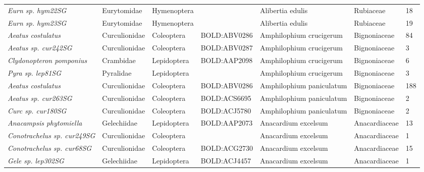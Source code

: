 \documentclass[11pt]{article}
\begin{document}
\begin{landscape}
\begin{longtable}{@{}lllllll@{}}
\textit{Eurn sp. hym22SG}                             & Eurytomidae     & Hymenoptera  &              & Alibertia edulis                   & Rubiaceae        & 18    \\
\textit{Eurn sp. hym23SG}                             & Eurytomidae     & Hymenoptera  &              & Alibertia edulis                   & Rubiaceae        & 19    \\
\textit{Aeatus costulatus}                            & Curculionidae   & Coleoptera   & BOLD:ABV0286 & Amphilophium crucigerum            & Bignoniaceae     & 84    \\
\textit{Aeatus sp. cur242SG}                          & Curculionidae   & Coleoptera   & BOLD:ABV0287 & Amphilophium crucigerum            & Bignoniaceae     & 3     \\
\textit{Clydonopteron pomponius}                      & Crambidae       & Lepidoptera  & BOLD:AAP2098 & Amphilophium crucigerum            & Bignoniaceae     & 6     \\
\textit{Pyra sp. lep81SG}                             & Pyralidae       & Lepidoptera  &              & Amphilophium crucigerum            & Bignoniaceae     & 3     \\
\textit{Aeatus costulatus}                            & Curculionidae   & Coleoptera   & BOLD:ABV0286 & Amphilophium paniculatum           & Bignoniaceae     & 188   \\
\textit{Aeatus sp. cur263SG}                          & Curculionidae   & Coleoptera   & BOLD:ACS6695 & Amphilophium paniculatum           & Bignoniaceae     & 2     \\
\textit{Curc sp. cur180SG}                            & Curculionidae   & Coleoptera   & BOLD:ACJ5780 & Amphilophium paniculatum           & Bignoniaceae     & 2     \\
\textit{Anacampsis phytomiella}                       & Gelechiidae     & Lepidoptera  & BOLD:AAP2073 & Anacardium excelsum                & Anacardiaceae    & 13    \\
\textit{Conotrachelus sp. cur249SG}                   & Curculionidae   & Coleoptera   &              & Anacardium excelsum                & Anacardiaceae    & 1     \\
\textit{Conotrachelus sp. cur68SG}                    & Curculionidae   & Coleoptera   & BOLD:ACG2730 & Anacardium excelsum                & Anacardiaceae    & 15    \\
\textit{Gele sp. lep302SG}                            & Gelechiidae     & Lepidoptera  & BOLD:ACJ4457 & Anacardium excelsum                & Anacardiaceae    & 1     \\

\end{longtable}
\end{landscape}
\end{document}
